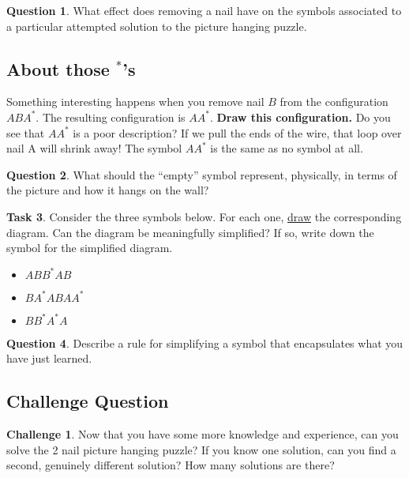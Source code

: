 \documentclass[12pt,letterpaper]{article}
\theoremstyle{definition}
\newtheorem{question}{Question}
\newtheorem*{challenge}{Challenge}
\newtheorem{task}[question]{Task}
\begin{document}
\begin{question}
What effect does removing a nail have on the symbols associated to a particular attempted solution to the picture hanging puzzle.
\end{question}

\subsection*{About those ${}^*$'s}

Something interesting happens when you remove nail $B$ from the configuration $ABA^*$.
The resulting configuration is $AA^*$.
\textbf{Draw this configuration.}
Do you see that $AA^*$ is a poor description?
If we pull the ends of the wire, that loop over nail A will shrink away!
The symbol $AA^*$ is the same as no symbol at all.
\begin{question}
What should the ``empty'' symbol represent, physically, in terms of the picture and how it hangs on the wall?
\end{question}

\begin{task}
Consider the three symbols below.
For each one, \underline{draw} the corresponding diagram.
Can the diagram be meaningfully simplified?
If so, write down the symbol for the simplified diagram.
\begin{itemize}
\item $ABB^*AB$
\item $BA^*ABAA^*$
\item $BB^*A^*A$
\end{itemize}
\end{task}

\begin{question}
Describe a rule for simplifying a symbol that encapsulates what you have just learned.
\end{question}

\subsection*{Challenge Question}

\begin{challenge}
Now that you have some more knowledge and experience, can you solve the 2 nail picture hanging puzzle? If you know one solution, can you find a second, genuinely different solution? How many solutions are there?
\end{challenge}


\end{document}
